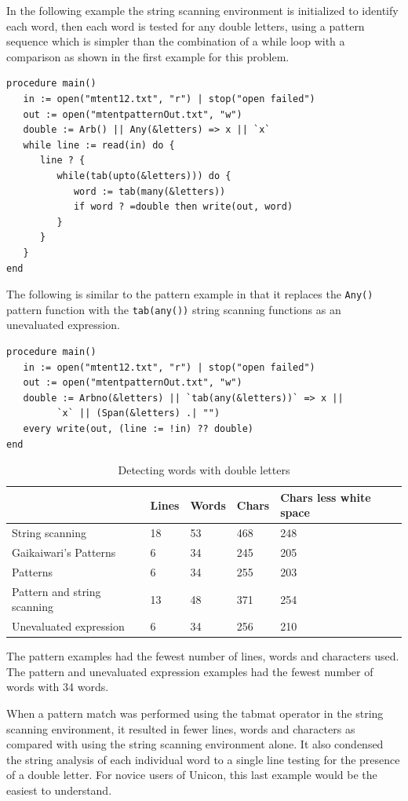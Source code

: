 \documentclass{article}
\begin{document}
In the following example the string scanning environment is initialized to identify each word, then each word is tested for any double letters, using a pattern sequence which is simpler than the combination of a while loop with a comparison as shown in the first example for this problem.
\begin{verbatim}
procedure main()
   in := open("mtent12.txt", "r") | stop("open failed")
   out := open("mtentpatternOut.txt", "w")
   double := Arb() || Any(&letters) => x || `x`
   while line := read(in) do {
      line ? {
         while(tab(upto(&letters))) do {
            word := tab(many(&letters))
            if word ? =double then write(out, word)
         }
      }
   }
end 
\end{verbatim}

The following is similar to the pattern example in that it replaces the \texttt{Any()} pattern function with the \texttt{tab(any())} string scanning functions as an unevaluated expression.\\
\begin{verbatim}
procedure main()
   in := open("mtent12.txt", "r") | stop("open failed")
   out := open("mtentpatternOut.txt", "w")
   double := Arbno(&letters) || `tab(any(&letters))` => x ||
         `x` || (Span(&letters) .| "")
   every write(out, (line := !in) ?? double)
end 
\end{verbatim}


\begin{table}[ht]
	\caption{Detecting words with double letters}
	\centering
	\begin{tabular}{|l|l|l|l|l|}
		\hline\hline
		 & Lines & Words & Chars & Chars less white space\\
		\hline
		String scanning & 18 & 53 & 468 & 248 \\
		Gaikaiwari's Patterns & 6 & 34 & 245 & 205 \\
		Patterns & 6 & 34 & 255 & 203 \\
		Pattern and string scanning & 13 & 48 & 371 & 254 \\
		Unevaluated expression & 6 & 34 & 256 & 210 \\
		\hline
	\end{tabular}
\end{table}

\pagebreak
The pattern examples had the fewest number of lines, words and characters used.  The pattern and unevaluated expression examples had the fewest number of words with 34 words.  

When a pattern match was performed using the tabmat operator in the string scanning environment, it resulted in fewer lines, words and characters as compared with using the string scanning environment alone.  It also condensed the string analysis of each individual word to a single line testing for the presence of a double letter.  For novice users of Unicon, this last example would be the easiest to understand.
\end{document}
